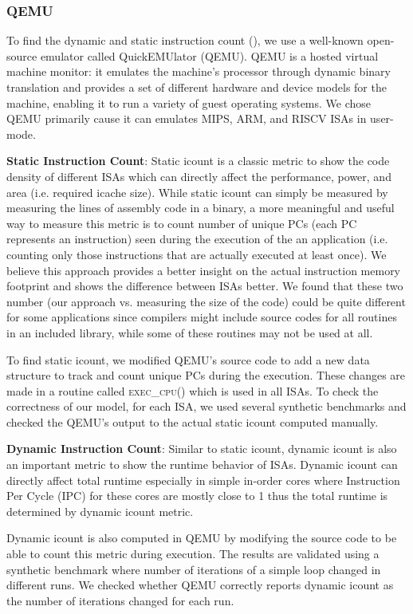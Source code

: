 \subsubsection{QEMU}
To find the dynamic and static instruction count (\icount), we use a well-known open-source emulator called QuickEMUlator (QEMU). QEMU is a hosted virtual machine monitor: it emulates the machine's processor through dynamic binary translation and provides a set of different hardware and device models for the machine, enabling it to run a variety of guest operating systems. We chose QEMU primarily cause it can emulates MIPS, ARM, and RISCV ISAs in user-mode. 



\noindent \textbf{Static Instruction Count}: Static icount is a classic metric to show the code density of different ISAs which can directly affect the performance, power, and area (i.e. required icache size). While static icount can simply be measured by measuring the lines of assembly code in a binary, a more meaningful and useful way to measure this metric is to count number of unique PCs (each PC represents an instruction) seen during the execution of the an application (i.e. counting only those instructions that are actually executed at least once). We believe this approach provides a better insight on the actual instruction memory footprint and shows the difference between ISAs better. We found that these two number (our approach vs. measuring the size of the code) could be quite different for some applications since compilers might include source codes for all routines in an included library, while some of these routines may not be used at all.  

To find static icount, we modified QEMU's source code to add a new data structure to track and count unique PCs during the execution. These changes are made in a routine called \textsc{exec\_cpu()} which is used in all ISAs. To check the correctness of our model, for each ISA, we used several synthetic benchmarks and checked the QEMU's output to the actual static icount computed manually. 

\noindent \textbf{Dynamic Instruction Count}: Similar to static icount, dynamic icount is also an important metric to show the runtime behavior of ISAs. Dynamic icount can directly affect total runtime especially in simple in-order cores where Instruction Per Cycle (IPC) for these cores are mostly close to 1 thus the total runtime is determined by dynamic icount metric. 

Dynamic icount is also computed in QEMU by modifying the source code to be able to count this metric during execution. The results are validated using a synthetic benchmark where number of iterations of a simple loop changed in different runs. We checked whether QEMU correctly reports dynamic icount as the number of iterations changed for each run. 

